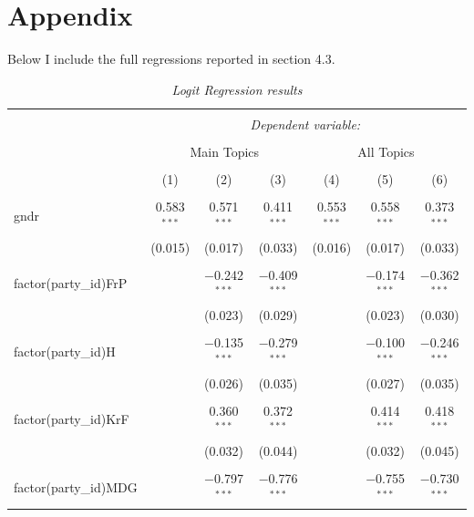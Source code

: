 \documentclass[12pt]{article}
\begin{document}
	\section{Appendix}
	
	Below I include the full regressions reported in section 4.3.
	
	\begin{landscape}
		
		\begin{longtable}{@{\extracolsep{5pt}}lcccccc} 
			\caption{\textit{Logit Regression results}} 
			\label{} 
			\\[-1.8ex]\hline 
			\hline \\[-1.8ex] 
			& \multicolumn{6}{c}{\textit{Dependent variable:}} \\ 
			\cline{2-7} 
			\\[-1.8ex] & \multicolumn{3}{c}{Main Topics} & \multicolumn{3}{c}{All Topics} \\ 
			\\[-1.8ex] & (1) & (2) & (3) & (4) & (5) & (6)\\ 
			\hline \\[-1.8ex] 
			gndr & 0.583$^{***}$ & 0.571$^{***}$ & 0.411$^{***}$ & 0.553$^{***}$ & 0.558$^{***}$ & 0.373$^{***}$ \\ 
			& (0.015) & (0.017) & (0.033) & (0.016) & (0.017) & (0.033) \\ 
			& & & & & & \\ 
			factor(party\_id)FrP &  & $-$0.242$^{***}$ & $-$0.409$^{***}$ &  & $-$0.174$^{***}$ & $-$0.362$^{***}$ \\ 
			&  & (0.023) & (0.029) &  & (0.023) & (0.030) \\ 
			& & & & & & \\ 
			factor(party\_id)H &  & $-$0.135$^{***}$ & $-$0.279$^{***}$ &  & $-$0.100$^{***}$ & $-$0.246$^{***}$ \\ 
			&  & (0.026) & (0.035) &  & (0.027) & (0.035) \\ 
			& & & & & & \\ 
			factor(party\_id)KrF &  & 0.360$^{***}$ & 0.372$^{***}$ &  & 0.414$^{***}$ & 0.418$^{***}$ \\ 
			&  & (0.032) & (0.044) &  & (0.032) & (0.045) \\ 
			& & & & & & \\ 
			factor(party\_id)MDG &  & $-$0.797$^{***}$ & $-$0.776$^{***}$ &  & $-$0.755$^{***}$ & $-$0.730$^{***}$ \\ 

\end{longtable}
\end{landscape}
\end{document}
